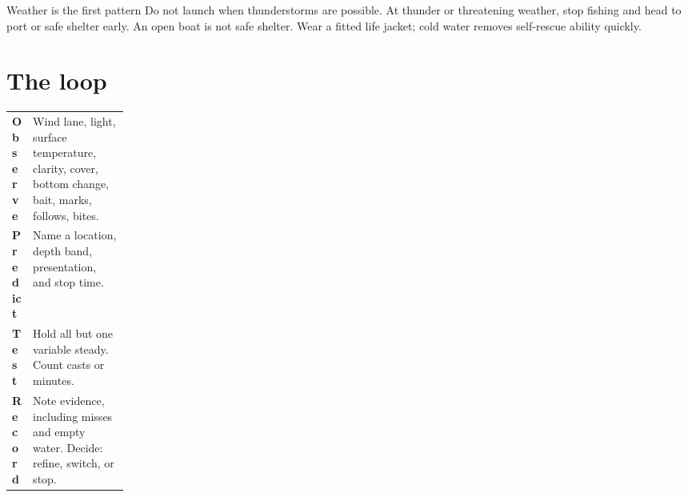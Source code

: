 


\begin{teloshazard}{Weather is the first pattern}
Do not launch when thunderstorms are possible. At thunder or threatening
weather, stop fishing and head to port or safe shelter early. An open boat is
not safe shelter. Wear a fitted life jacket; cold water removes self-rescue
ability quickly.
\end{teloshazard}

\section{The loop}
\begin{center}
\end{center}

\begin{tabularx}{\linewidth}{@{}p{0.17\linewidth}X@{}}
\toprule
\textbf{Observe} & Wind lane, light, surface temperature, clarity, cover,
bottom change, bait, marks, follows, bites.\\
\textbf{Predict} & Name a location, depth band, presentation, and stop time.\\
\textbf{Test} & Hold all but one variable steady. Count casts or minutes.\\
\textbf{Record} & Note evidence, including misses and empty water. Decide:
refine, switch, or stop.\\
\bottomrule
\end{tabularx}

